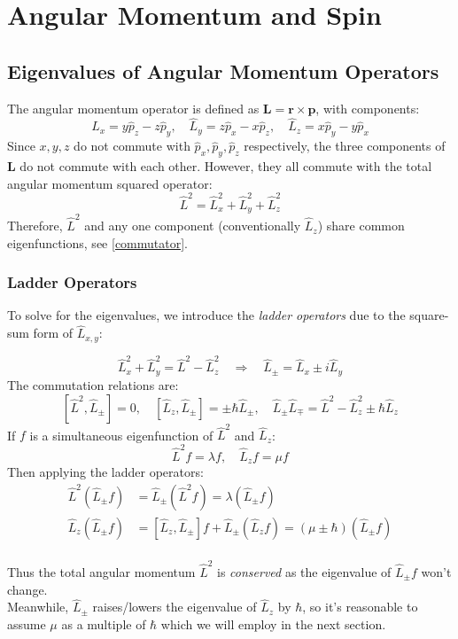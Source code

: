 \chapter{Angular Momentum and Spin}
\section{Eigenvalues of Angular Momentum Operators}

The angular momentum operator is defined as $\mathbf{L} = \mathbf{r} \times \mathbf{p}$, with components:
\[
    \hat{L}_x = y\hat{p}_z - z\hat{p}_y, \quad
    \hat{L}_y = z\hat{p}_x - x\hat{p}_z, \quad
    \hat{L}_z = x\hat{p}_y - y\hat{p}_x
\]
%
Since $x, y, z$ do not commute with $\hat{p}_x, \hat{p}_y, \hat{p}_z$ respectively, the three components of $\mathbf{L}$ do not commute with each other. However, they all commute with the total angular momentum squared operator:
\[
    \hat{L}^2 = \hat{L}_x^2 + \hat{L}_y^2 + \hat{L}_z^2
\]
%
Therefore, $\hat{L}^2$ and any one component (conventionally $\hat{L}_z$) share common eigenfunctions, see \ref{commutator}.

\subsection{Ladder Operators}

To solve for the eigenvalues, we introduce the \emph{ladder operators} due to the square-sum form of $\hat{L}_{x,y}$:

\[
    \hat{L}_x^2 + \hat{L}_y^2 = \hat{L}^2 - \hat{L}_z^2 
    \quad \Rightarrow \quad
    \hat{L}_{\pm} = \hat{L}_x \pm i\hat{L}_y
\]
%
The commutation relations are:
\[
    [\hat{L}^2, \hat{L}_{\pm}] = 0, \quad [\hat{L}_z, \hat{L}_{\pm}] = \pm\hbar\hat{L}_{\pm}, \quad \hat{L}_{\pm}\hat{L}_{\mp} = \hat{L}^2 - \hat{L}_z^2 \pm \hbar\hat{L}_z
\]
If $f$ is a simultaneous eigenfunction of $\hat{L}^2$ and $\hat{L}_z$:
\[
    \hat{L}^2 f = \lambda f, \quad \hat{L}_z f = \mu f
\]
Then applying the ladder operators:
\[\begin{aligned}
    \hat{L}^2(\hat{L}_{\pm}f) &= \hat{L}_{\pm}(\hat{L}^2f)  = \lambda(\hat{L}_{\pm}f) \\
    \hat{L}_z(\hat{L}_{\pm}f) &= [\hat{L}_z, \hat{L}_{\pm}]f + \hat{L}_{\pm}(\hat{L}_{z}f) = (\mu \pm \hbar)(\hat{L}_{\pm}f)
\end{aligned}\]\\
Thus the total angular momentum $\hat{L}^2$ is \emph{conserved} as the eigenvalue of $\hat{L}_{\pm}f$ won't change.\\
Meanwhile, $\hat{L}_{\pm}$ raises/lowers the eigenvalue of $\hat{L}_z$ by $\hbar$, so it's reasonable to assume $\mu$ as a multiple of $\hbar$ which we will employ in the next section.\\


